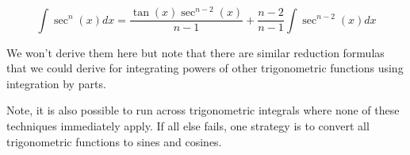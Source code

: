 \documentclass{ximera}
\begin{document}
\[
\int \sec^{n}(x) dx= \frac{\tan(x) \sec^{n-2}(x)}{n-1} + \frac{n-2}{n-1} \int \sec^{n-2}(x) dx 
\]

We won't derive them here but note that there are similar reduction formulas that we could derive for integrating powers of other trigonometric functions using integration by parts. 

%
%
%
%
%
%
%
%
%
%
%
%
\begin{remark}
Note, it is also possible to run across trigonometric integrals where none of these techniques immediately apply.  If all else fails, one strategy is to convert all trigonometric functions to sines and cosines.
\end{remark}
\end{document}
